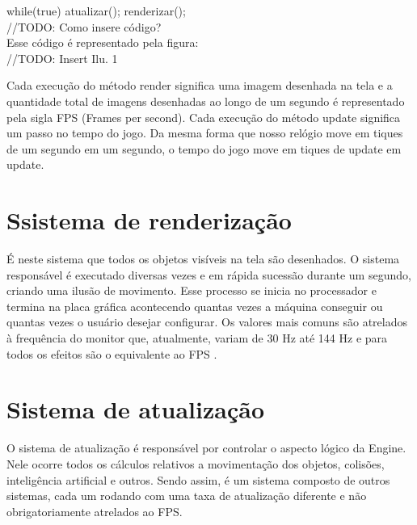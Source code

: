 \documentclass[12pt, 
openright, 
oneside, 
a4paper,    
brazil]{facom-ufu-abntex2}
\begin{document}
while(true) {
	atualizar();
	renderizar();
}
\\//TODO: Como insere código?
\\Esse código é representado pela figura:
\\//TODO: Insert Ilu. 1

Cada execução do método render significa uma imagem desenhada na tela e a quantidade total de imagens desenhadas ao longo de um segundo é representado pela sigla FPS (Frames per second). Cada execução do método update significa um passo no tempo do jogo. Da mesma forma que nosso relógio move em tiques de um segundo em um segundo, o tempo do jogo move em tiques de update em update.

\section{Ssistema de renderização}
É neste sistema que todos os objetos visíveis na tela são desenhados. O sistema responsável é executado diversas vezes e em rápida sucessão durante um segundo, criando uma ilusão de movimento. Esse processo se inicia no processador e termina na placa gráfica acontecendo quantas vezes a máquina conseguir ou quantas vezes o usuário desejar configurar. Os valores mais comuns são atrelados à frequência do monitor que, atualmente, variam de 30 Hz até 144 Hz e para todos os efeitos são o equivalente ao FPS \cite{GameEngineArchitecture}.

\section{Sistema de atualização}
O sistema de atualização é responsável por controlar o aspecto lógico da Engine. Nele ocorre todos os cálculos relativos a movimentação dos objetos, colisões, inteligência artificial e outros. Sendo assim, é um sistema composto de outros sistemas, cada um rodando com uma taxa de atualização diferente e não obrigatoriamente atrelados ao FPS.
\end{document}

